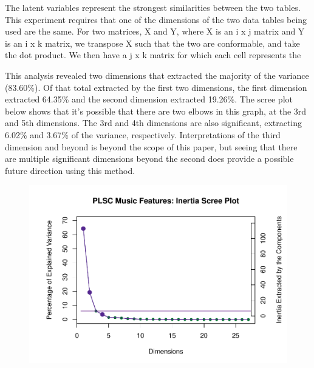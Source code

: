 \documentclass[
  english,
  man,floatsintext]{apa6}
\begin{document}
The latent variables represent the strongest similarities between the two tables. This experiment requires that one of the dimensions of the two data tables being used are the same. For two matrices, X and Y, where X is an i x j matrix and Y is an i x k matrix, we transpose X such that the two are conformable, and take the dot product. We then have a j x k matrix for which each cell represents the

This analysis revealed two dimensions that extracted the majority of the variance (83.60\%). Of that total extracted by the first two dimensions, the first dimension extracted 64.35\% and the second dimension extracted 19.26\%. The scree plot below shows that it's possible that there are two elbows in this graph, at the 3rd and 5th dimensions. The 3rd and 4th dimensions are also significant, extracting 6.02\% and 3.67\% of the variance, respectively. Interpretations of the third dimension and beyond is beyond the scope of this paper, but seeing that there are multiple significant dimensions beyond the second does provide a possible future direction using this method.

\begin{figure}

{\centering \includegraphics{Music-Descriptor-Space_files/figure-latex/screePLSC-1} 

}

\caption{ }\label{fig:screePLSC}
\end{figure}
\end{document}
